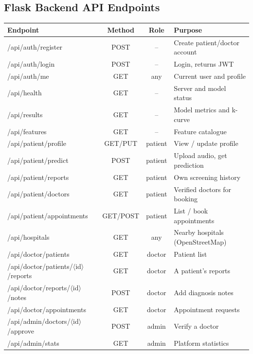 \documentclass[oneside,a4paper,12pt]{report}
\begin{document}
\begin{appendices}
\chapter{Flask Backend API Endpoints}
\begin{longtable}{|p{5.4cm}|c|c|p{4.6cm}|}
\hline
\textbf{Endpoint} & \textbf{Method} & \textbf{Role} & \textbf{Purpose} \\ \hline
\endhead
/api/auth/register & POST & -- & Create patient/doctor account \\ \hline
/api/auth/login & POST & -- & Login, returns JWT \\ \hline
/api/auth/me & GET & any & Current user and profile \\ \hline
/api/health & GET & -- & Server and model status \\ \hline
/api/results & GET & -- & Model metrics and k-curve \\ \hline
/api/features & GET & -- & Feature catalogue \\ \hline
/api/patient/profile & GET/PUT & patient & View / update profile \\ \hline
/api/patient/predict & POST & patient & Upload audio, get prediction \\ \hline
/api/patient/reports & GET & patient & Own screening history \\ \hline
/api/patient/doctors & GET & patient & Verified doctors for booking \\ \hline
/api/patient/appointments & GET/POST & patient & List / book appointments \\ \hline
/api/hospitals & GET & any & Nearby hospitals (OpenStreetMap) \\ \hline
/api/doctor/patients & GET & doctor & Patient list \\ \hline
/api/doctor/patients/$\langle$id$\rangle$/reports & GET & doctor & A patient's reports \\ \hline
/api/doctor/reports/$\langle$id$\rangle$/notes & POST & doctor & Add diagnosis notes \\ \hline
/api/doctor/appointments & GET & doctor & Appointment requests \\ \hline
/api/admin/doctors/$\langle$id$\rangle$/approve & POST & admin & Verify a doctor \\ \hline
/api/admin/stats & GET & admin & Platform statistics \\ \hline
\end{longtable}


\end{appendices}
\end{document}
